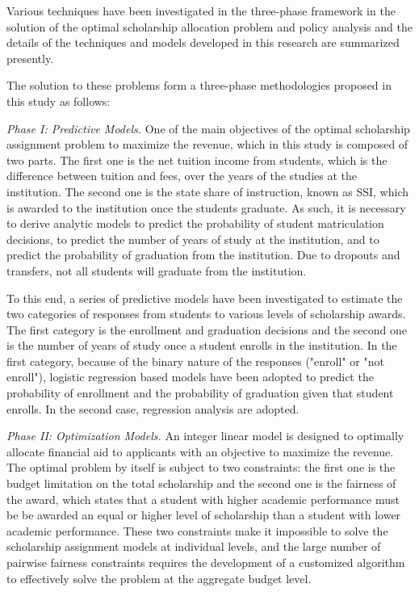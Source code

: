 \documentclass[12pt,english]{report}
\begin{document}
Various techniques have been investigated in the three-phase framework in the 
solution of the optimal scholarship allocation problem and policy analysis and 
the details of the techniques and models developed in this research are 
summarized presently.

The solution to these problems form a three-phase methodologies proposed in 
this study as follows:

\vspace*{.1in} 
\noindent \textit{Phase I: Predictive Models.} 
One of the main objectives of the optimal scholarship assignment problem to 
maximize the revenue, which in this study is composed of two parts. The first 
one is the net tuition income from students, which is the difference between 
tuition and fees, over the years of the studies at the institution. The second 
one is the state share of instruction, known as SSI, which is awarded to the 
institution once the students graduate.  As such,  it is necessary to derive 
analytic models to predict the probability of student matriculation decisions, 
to predict the number of years of study at the institution, and to predict the 
probability of graduation from the institution. Due to dropouts and transfers, 
not all students will graduate from the institution. 

To this end, a series of predictive models have been investigated to estimate 
the two categories of responses from students to various levels of scholarship 
awards. The first category is the enrollment and graduation decisions and the 
second one is the number of years of study once a student enrolls in the 
institution. In the first category, because of the binary nature of the 
responses ("enroll" or "not enroll"), logistic regression based models 
have been adopted to predict the probability of enrollment and the probability 
of graduation given that student enrolls. In the second case, regression analysis are adopted.


\noindent \textit{Phase II: Optimization Models.}  An integer linear model 
is designed to optimally allocate financial aid to applicants with an 
objective to maximize the revenue. The optimal problem by itself is subject 
to two constraints: the first one is the budget limitation on the total 
scholarship and the second one is the fairness of the award, which states 
that a student with higher academic performance must be be awarded an equal 
or higher level of scholarship than a student with lower academic 
performance. These two constraints make it impossible to solve the 
scholarship assignment models at individual levels, and the large number of 
pairwise fairness  constraints requires the development of a customized 
algorithm to effectively solve the problem at the aggregate budget level.
\end{document}
